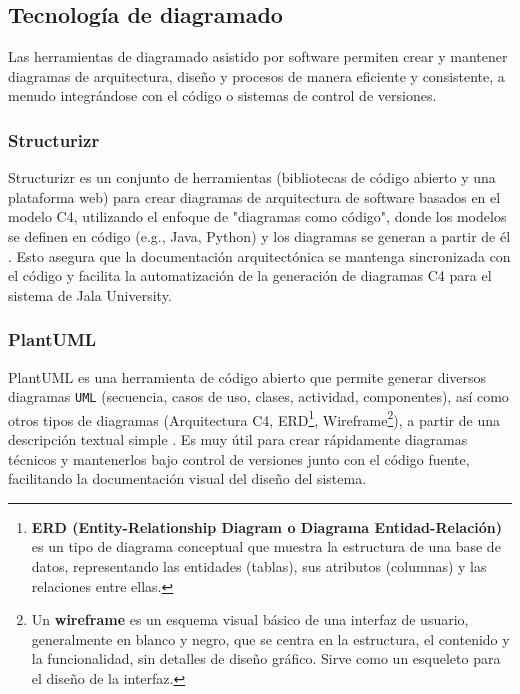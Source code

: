 \subsection{Tecnología de diagramado}
Las herramientas de diagramado asistido por software permiten crear y mantener diagramas de arquitectura, diseño y procesos de manera eficiente y consistente, a menudo integrándose con el código o sistemas de control de versiones.

\subsubsection{Structurizr}
Structurizr es un conjunto de herramientas (bibliotecas de código abierto y una plataforma web) para crear diagramas de arquitectura de software basados en el modelo C4, utilizando el enfoque de "diagramas como código", donde los modelos se definen en código (e.g., Java, Python) y los diagramas se generan a partir de él \parencite{BrownStructurizr}.
Esto asegura que la documentación arquitectónica se mantenga sincronizada con el código y facilita la automatización de la generación de diagramas C4 para el sistema de Jala University.

\subsubsection{PlantUML}
PlantUML es una herramienta de código abierto que permite generar diversos diagramas \texttt{UML} (secuencia, casos de uso, clases, actividad, componentes), así como otros tipos de diagramas (Arquitectura C4, ERD\footnote{\textbf{ERD (Entity-Relationship Diagram o Diagrama Entidad-Relación)} es un tipo de diagrama conceptual que muestra la estructura de una base de datos, representando las entidades (tablas), sus atributos (columnas) y las relaciones entre ellas.}, Wireframe\footnote{Un \textbf{wireframe} es un esquema visual básico de una interfaz de usuario, generalmente en blanco y negro, que se centra en la estructura, el contenido y la funcionalidad, sin detalles de diseño gráfico.
Sirve como un esqueleto para el diseño de la interfaz.}), a partir de una descripción textual simple \parencite{PlantUML}.
Es muy útil para crear rápidamente diagramas técnicos y mantenerlos bajo control de versiones junto con el código fuente, facilitando la documentación visual del diseño del sistema.
